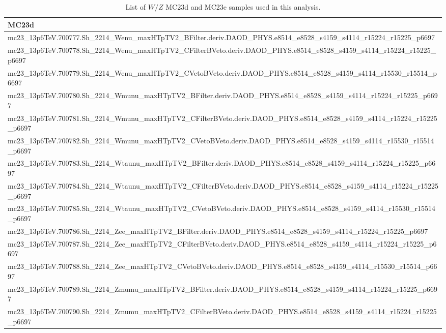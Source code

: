 \begin{table}[ht]
\centering
\scriptsize
\caption{List of $W/Z$ MC23d and MC23e samples used in this analysis.}
\label{tab:V-samples}
\begin{tabular}{l}
\toprule
MC23d \\
\midrule
mc23\_13p6TeV.700777.Sh\_2214\_Wenu\_maxHTpTV2\_BFilter.deriv.DAOD\_PHYS.e8514\_e8528\_s4159\_s4114\_r15224\_r15225\_p6697 \\
mc23\_13p6TeV.700778.Sh\_2214\_Wenu\_maxHTpTV2\_CFilterBVeto.deriv.DAOD\_PHYS.e8514\_e8528\_s4159\_s4114\_r15224\_r15225\_p6697 \\
mc23\_13p6TeV.700779.Sh\_2214\_Wenu\_maxHTpTV2\_CVetoBVeto.deriv.DAOD\_PHYS.e8514\_e8528\_s4159\_s4114\_r15530\_r15514\_p6697 \\
mc23\_13p6TeV.700780.Sh\_2214\_Wmunu\_maxHTpTV2\_BFilter.deriv.DAOD\_PHYS.e8514\_e8528\_s4159\_s4114\_r15224\_r15225\_p6697 \\
mc23\_13p6TeV.700781.Sh\_2214\_Wmunu\_maxHTpTV2\_CFilterBVeto.deriv.DAOD\_PHYS.e8514\_e8528\_s4159\_s4114\_r15224\_r15225\_p6697 \\
mc23\_13p6TeV.700782.Sh\_2214\_Wmunu\_maxHTpTV2\_CVetoBVeto.deriv.DAOD\_PHYS.e8514\_e8528\_s4159\_s4114\_r15530\_r15514\_p6697 \\
mc23\_13p6TeV.700783.Sh\_2214\_Wtaunu\_maxHTpTV2\_BFilter.deriv.DAOD\_PHYS.e8514\_e8528\_s4159\_s4114\_r15224\_r15225\_p6697 \\
mc23\_13p6TeV.700784.Sh\_2214\_Wtaunu\_maxHTpTV2\_CFilterBVeto.deriv.DAOD\_PHYS.e8514\_e8528\_s4159\_s4114\_r15224\_r15225\_p6697 \\
mc23\_13p6TeV.700785.Sh\_2214\_Wtaunu\_maxHTpTV2\_CVetoBVeto.deriv.DAOD\_PHYS.e8514\_e8528\_s4159\_s4114\_r15530\_r15514\_p6697 \\
mc23\_13p6TeV.700786.Sh\_2214\_Zee\_maxHTpTV2\_BFilter.deriv.DAOD\_PHYS.e8514\_e8528\_s4159\_s4114\_r15224\_r15225\_p6697 \\
mc23\_13p6TeV.700787.Sh\_2214\_Zee\_maxHTpTV2\_CFilterBVeto.deriv.DAOD\_PHYS.e8514\_e8528\_s4159\_s4114\_r15224\_r15225\_p6697 \\
mc23\_13p6TeV.700788.Sh\_2214\_Zee\_maxHTpTV2\_CVetoBVeto.deriv.DAOD\_PHYS.e8514\_e8528\_s4159\_s4114\_r15530\_r15514\_p6697 \\
mc23\_13p6TeV.700789.Sh\_2214\_Zmumu\_maxHTpTV2\_BFilter.deriv.DAOD\_PHYS.e8514\_e8528\_s4159\_s4114\_r15224\_r15225\_p6697 \\
mc23\_13p6TeV.700790.Sh\_2214\_Zmumu\_maxHTpTV2\_CFilterBVeto.deriv.DAOD\_PHYS.e8514\_e8528\_s4159\_s4114\_r15224\_r15225\_p6697 \\

\end{tabular}
\end{table}

